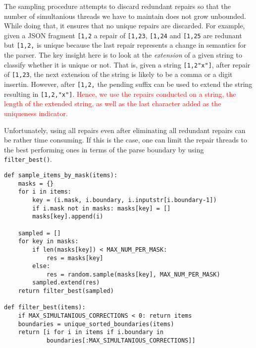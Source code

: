 \documentclass[sigconf,review,anonymous]{acmart}
\def\<#1>{\texttt{#1}}
\newcounter{todocounter}
\newcommand{\todo}[1]{\marginpar{$|$}\textcolor{red}{\stepcounter{todocounter}\footnote[\thetodocounter]{\textcolor{red}{\textbf{TODO }}\textit{#1}}}}
\newcommand{\recheck}[1]{\textcolor{red}{#1}}
\renewcommand{\todo}[1]{}
\newcommand{\approach}{\textsc{FSynth}\xspace}
\begin{document}
The sampling procedure attempts to discard redundant repairs so that the number
of simultanious threads we have to maintain does not grow unbounded. While doing
that, it ensures that no unique repairs are discarded. For
example, given a JSON fragment \<[1,2> a repair of \<[1,23>, \<[1,24>
and \<[1,25> are redunant but \<[1,2,> is unique because the last repair
represents a change in semantics for the parser. The key insight here is to
look at the \emph{extension} of a given string to classify whether it is unique
or not. That is, given a string \<[1,2"x"]>, after repair of \<[1,23>, the next
extension of the string is likely to be a comma or a digit insertin. However,
after \<[1,2,> the pending suffix can be used to extend the string resulting in
\<[1,2,"x"]>. \recheck{Hence, we use the repairs conducted on a string, the
length of the extended string, as well as the last character added as the
uniqueness indicator.}\todo{@Lukas: does the new implementation contain this check? I cant remember this check in the old implementation of \approach?}

Unfortunately, using all repairs even after eliminating all redundant repairs
can be rather time consuming. If this is the case, one can limit the repair
threads to the best performing ones in terms of the parse boundary by using
\<filter\_best()>.

\begin{lstlisting}[caption=Sampling,label={lst:sampling}]
def sample_items_by_mask(items):
    masks = {}
    for i in items:
        key = (i.mask, i.boundary, i.inputstr[i.boundary-1])
        if i.mask not in masks: masks[key] = []
        masks[key].append(i)

    sampled = []
    for key in masks:
        if len(masks[key]) < MAX_NUM_PER_MASK:
            res = masks[key]
        else:
            res = random.sample(masks[key], MAX_NUM_PER_MASK)
        sampled.extend(res)
    return filter_best(sampled)

def filter_best(items):
    if MAX_SIMULTANIOUS_CORRECTIONS < 0: return items
    boundaries = unique_sorted_boundaries(items)
    return [i for i in items if i.boundary in
            boundaries[:MAX_SIMULTANIOUS_CORRECTIONS]]
\end{lstlisting}
\end{document}
